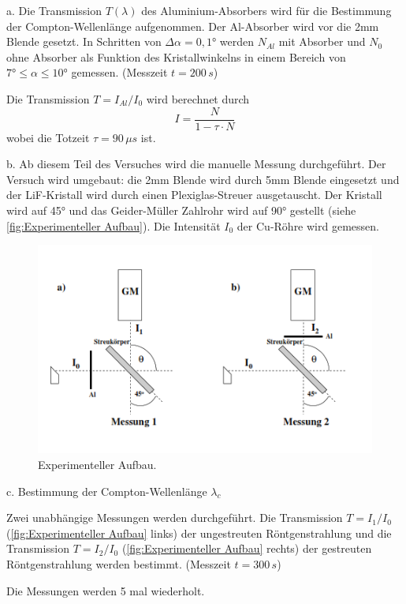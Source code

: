  a. Die Transmission $T(\lambda)$ des Aluminium-Absorbers wird für die Bestimmung der Compton-Wellenlänge aufgenommen.
 Der Al-Absorber wird vor die 2mm Blende gesetzt. 
 In Schritten von \(\Delta\alpha=0,1° \) werden $N_{Al}$ mit Absorber und $N_{0}$ ohne Absorber als Funktion des Kristallwinkelns in einem Bereich von \(7° \leq \alpha \leq 10°\) gemessen. (Messzeit \(t=200 \,s \))

 Die Transmission \(T= I_{Al}/ I_0\) wird berechnet durch
 \begin{equation}
  I= \frac{N}{1-\tau \cdot N}
  \end{equation}
  wobei die Totzeit \(\tau=90 \,\mu s \) ist.
 
  b. Ab diesem Teil des Versuches wird die manuelle Messung durchgeführt.
  Der Versuch wird umgebaut: die 2mm Blende wird durch 5mm Blende eingesetzt und der LiF-Kristall wird durch einen Plexiglas-Streuer ausgetauscht. 
  Der Kristall wird auf 45° und das Geider-Müller Zahlrohr wird auf 90° gestellt (siehe \autoref{fig:Experimenteller Aufbau}).
 Die Intensität $I_0$ der Cu-Röhre wird gemessen.
\begin{figure}[H]
    \centering
    \includegraphics{Experimenteller Aufbau.png}
    \caption{Experimenteller Aufbau.}
    \label{fig:Experimenteller Aufbau}
  \end{figure} 
  c. Bestimmung der Compton-Wellenlänge $\lambda_c$
 
Zwei unabhängige Messungen werden durchgeführt.
Die Transmission \(T= I_1 / I_0\) (\autoref{fig:Experimenteller Aufbau} links) der ungestreuten Röntgenstrahlung und die Transmission \(T= I_2 / I_0\) (\autoref{fig:Experimenteller Aufbau} rechts) der gestreuten Röntgenstrahlung werden bestimmt. 
(Messzeit \(t=300 \,s\))

Die Messungen werden 5 mal wiederholt.
\cite{AL}
\newpage